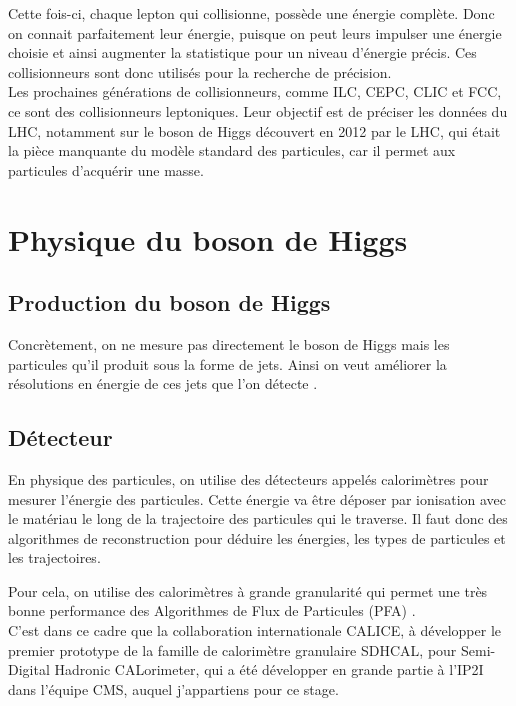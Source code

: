 Cette fois-ci, chaque lepton qui collisionne, possède une énergie complète. Donc on connait parfaitement leur énergie, puisque on peut leurs impulser une énergie choisie et ainsi augmenter la statistique pour un niveau d'énergie précis.
Ces collisionneurs sont donc utilisés pour la recherche de précision.\\


Les prochaines générations de collisionneurs, comme ILC, CEPC, CLIC et FCC, ce sont des collisionneurs leptoniques. 
Leur objectif est de préciser les données du LHC, notamment sur le boson de Higgs découvert en 2012 par le LHC, qui était la pièce manquante du modèle standard des particules, car il permet aux particules d'acquérir une masse.

\section{Physique du boson de Higgs}

\subsection{Production du boson de Higgs}

Concrètement, on ne mesure pas directement le boson de Higgs mais les particules qu'il produit sous la forme de jets.
Ainsi on veut améliorer la résolutions en énergie de ces jets que l'on détecte \cite{liu:tel-03405418}.

\subsection{Détecteur}

En physique des particules, on utilise des détecteurs appelés calorimètres pour mesurer l'énergie des particules. 
Cette énergie va être déposer par ionisation avec le matériau le long de la trajectoire des particules qui le traverse. 
Il faut donc des algorithmes de reconstruction pour déduire les énergies, les types de particules et les trajectoires.

Pour cela, on utilise des calorimètres à grande granularité qui permet une très bonne performance des Algorithmes de Flux de Particules (PFA) \cite{liu:tel-03405418}. \\

C'est dans ce cadre que la collaboration internationale CALICE, à développer le premier prototype de la famille de calorimètre granulaire SDHCAL, pour Semi-Digital Hadronic CALorimeter, qui a été développer en grande partie à l'IP2I dans l'équipe CMS, auquel j'appartiens pour ce stage.

